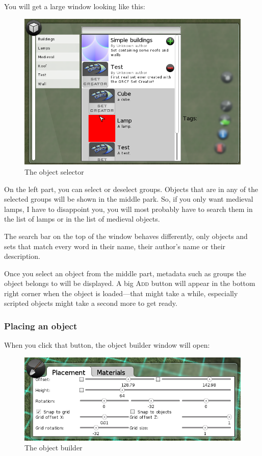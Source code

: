 \documentclass[a4paper]{article}
\newcommand{\ccaption}[1]{\textsc{#1}}
\begin{document}
You will get a large window looking like this:
\begin{figure}[h]
  \begin{center}
    \includegraphics[width=140mm]{./images/objectselector.png}
  \end{center}
  \caption{The object selector}
\end{figure}

On the left part, you can select or deselect groups. Objects that are in any of the selected groups will be shown in the middle park.
So, if you only want medieval lamps, I have to disappoint you, you will most probably have to search them in the list of lamps or in
the list of medieval objects.

The search bar on the top of the window behaves differently, only objects and sets that match every word in their name, their author's name
or their description.

Once you select an object from the middle part, metadata such as groups the object belongs to will be displayed. A big \ccaption{Add}
button will appear in the bottom right corner when the object is loaded---that might take a while, especially scripted objects might take a
second more to get ready.

\subsubsection{Placing an object}
When you click that button, the object builder window will open:
\begin{figure}[h]
  \begin{center}
    \includegraphics[width=120mm]{./images/objectbuilder.png}
  \end{center}
  \caption{The object builder}
\end{figure}
\end{document}

